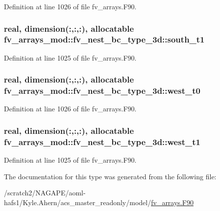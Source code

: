 Definition at line 1026 of file fv\-\_\-arrays.\-F90.

\subsubsection[{south\-\_\-t1}]{\setlength{\rightskip}{0pt plus 5cm}real, dimension(\-:,\-:,\-:), allocatable fv\-\_\-arrays\-\_\-mod\-::fv\-\_\-nest\-\_\-bc\-\_\-type\-\_\-3d\-::south\-\_\-t1}\label{structfv__arrays__mod_1_1fv__nest__bc__type__3d_a849ce48eb3170962785f03b4d43cf3f1}


Definition at line 1025 of file fv\-\_\-arrays.\-F90.

\subsubsection[{west\-\_\-t0}]{\setlength{\rightskip}{0pt plus 5cm}real, dimension(\-:,\-:,\-:), allocatable fv\-\_\-arrays\-\_\-mod\-::fv\-\_\-nest\-\_\-bc\-\_\-type\-\_\-3d\-::west\-\_\-t0}\label{structfv__arrays__mod_1_1fv__nest__bc__type__3d_a168361be4515cf7122a8037445ecbded}


Definition at line 1026 of file fv\-\_\-arrays.\-F90.

\subsubsection[{west\-\_\-t1}]{\setlength{\rightskip}{0pt plus 5cm}real, dimension(\-:,\-:,\-:), allocatable fv\-\_\-arrays\-\_\-mod\-::fv\-\_\-nest\-\_\-bc\-\_\-type\-\_\-3d\-::west\-\_\-t1}\label{structfv__arrays__mod_1_1fv__nest__bc__type__3d_a1024840d7c642d142fdff9f39b999234}


Definition at line 1025 of file fv\-\_\-arrays.\-F90.



The documentation for this type was generated from the following file\-:\begin{DoxyCompactItemize}
\item 
/scratch2/\-N\-A\-G\-A\-P\-E/aoml-\/hafs1/\-Kyle.\-Ahern/acs\-\_\-master\-\_\-readonly/model/\hyperlink{fv__arrays_8F90}{fv\-\_\-arrays.\-F90}\end{DoxyCompactItemize}
